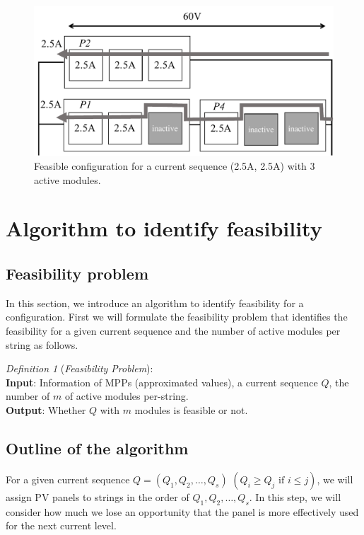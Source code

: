\documentclass[journal]{IEEEtran}
\begin{document}
\begin{figure}[htbp]
    \centering
    \includegraphics[width=\linewidth]{fig/feasible-configuration.pdf}
    \caption{Feasible configuration for a current sequence (2.5A, 2.5A) with 3 active modules.}
    \label{fig:feasibleassign}
\end{figure}

\section{Algorithm to identify feasibility}\label{sec:algor-ident-feas}
\subsection{Feasibility problem}\label{sec:feasibility-problem}
In this section, we introduce an algorithm to identify feasibility for a configuration.
First we will formulate the feasibility problem that identifies the feasibility for a given current sequence and the number of active modules per string as follows.

\textit{Definition 1} (\textit{Feasibility Problem}):\\
\textbf{Input}: Information of MPPs (approximated values), a current sequence $Q$, the number of $m$ of active modules per-string.\\
\textbf{Output}: Whether $Q$ with $m$ modules is feasible or not.

\subsection{Outline of the algorithm}\label{sec:outline-algorithm}
For a given current sequence $Q = (Q_{1},Q_{2},\ldots ,Q_{s})$ $(Q_{i} \geq Q_{j} \mbox{\ if\ } i \leq j)$, we will assign PV panels to strings in the order of $Q_{1},Q_{2},\ldots ,Q_{s}$.
In this step, we will consider how much we lose an opportunity that the panel is more effectively used for the next current level.
\end{document}
